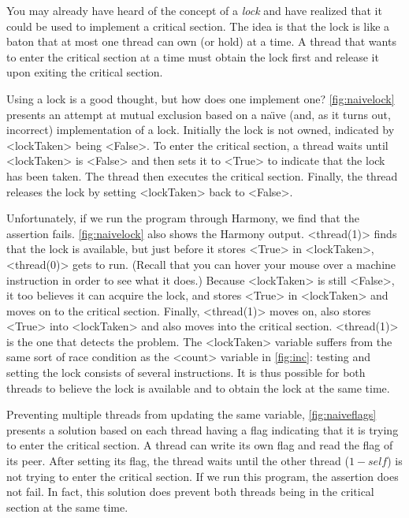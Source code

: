 \documentclass{report}
\begin{document}
%

You may already have heard of the concept of a \emph{lock}
%
and have realized that
it could be used to implement a critical section.
The idea is that the lock is like a baton that at most one thread can own
(or hold) at a time.
A thread that wants to enter the critical section at a time must obtain the
lock first and release it upon exiting the critical section.

Using a lock is a good thought, but how does one implement one?
\autoref{fig:naivelock} presents an attempt at mutual exclusion based on a
na\"{\i}ve (and, as it turns out, incorrect) implementation of a lock.
Initially the lock is not owned, indicated by <{lockTaken}> being <{False}>.
To enter the critical section, a thread waits until <{lockTaken}> is <{False}>
and then sets it to <{True}> to indicate that the lock has been taken.
The thread then executes the critical section.  Finally, the thread
releases the lock by setting <{lockTaken}> back to <{False}>.

Unfortunately, if we run the program through Harmony, we find that
the assertion fails.  \autoref{fig:naivelock} also shows the Harmony
output.  <{thread(1)}> finds that the lock is available, but just
before it stores <{True}> in <{lockTaken}>, <{thread(0)}> gets to
run.  (Recall that you can hover your mouse over a machine instruction
in order to see what it does.) Because <{lockTaken}> is still
<{False}>, it too believes it can acquire the lock, and stores
<{True}> in <{lockTaken}> and moves on to the critical section.
Finally, <{thread(1)}> moves on, also stores <{True}> into <{lockTaken}>
and also moves into the critical section.  <{thread(1)}> is the one
that detects the problem.  The <{lockTaken}> variable suffers from
the same sort of race condition as the <{count}> variable in
\autoref{fig:inc}: testing and setting the lock consists of several
instructions.  It is thus possible for both threads to believe the
lock is available and to obtain the lock at the same time.

Preventing multiple threads from updating the same variable,
\autoref{fig:naiveflags} presents a solution based on each thread having
a flag indicating that it is trying to enter the critical section.
A thread can write its own flag and read the flag of its peer.
After setting its flag, the thread waits until the other thread
($1 - \mathit{self}$) is not trying to enter the critical section.
If we run this program, the assertion does not fail.  In fact, this
solution does prevent both threads being in the critical section at
the same time.
\end{document}
